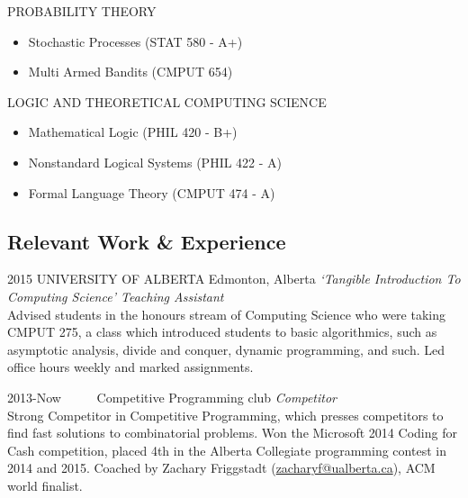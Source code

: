 \documentclass{friggeri-cv} %
\begin{document}
\begin{entrylist}

\entries
{PROBABILITY THEORY}
{
\begin{itemize}
    \setlength\itemsep{-1em}
    \item Stochastic Processes (STAT 580 - A+)\\
    \item Multi Armed Bandits (CMPUT 654)
\end{itemize}
}


\entries
{LOGIC AND THEORETICAL COMPUTING SCIENCE}
{
\begin{itemize}
    \setlength\itemsep{-1em}
    \item Mathematical Logic (PHIL 420 - B+)\\
    \item Nonstandard Logical Systems (PHIL 422 - A)\\
    \item Formal Language Theory (CMPUT 474 - A)
\end{itemize}
}


\end{entrylist}

\pagebreak[2]
\subsection{Relevant Work \& Experience}

\begin{entrylist}

\entry
{2015}
{UNIVERSITY OF ALBERTA}
{Edmonton, Alberta}
{\emph{`Tangible Introduction To Computing Science' Teaching Assistant} \\
Advised students in the honours stream of Computing Science who were taking CMPUT 275, a class which introduced students to basic algorithmics, such as asymptotic analysis, divide and conquer, dynamic programming, and such. Led office hours weekly and marked assignments.}


\entry
{2013-Now\ \ \ \ \ }
{Competitive Programming club}
{}
{\emph{Competitor} \\
Strong Competitor in Competitive Programming, which presses competitors to find fast solutions to combinatorial problems. Won the Microsoft 2014 Coding for Cash competition, placed 4th in the Alberta Collegiate programming contest in 2014 and 2015. Coached by Zachary Friggstadt (\href{mailto:zacharyf@ualberta.ca}{zacharyf@ualberta.ca}), ACM world finalist.}

\end{entrylist}
\end{document}
